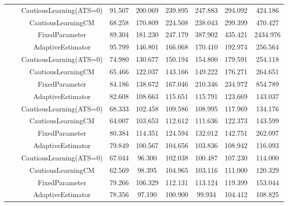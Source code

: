 \begin{table}[!h]
\begin{tabular}[t]{ccccccccc}
 &  & CautiousLearning(ATS=0) & 91.507 & 200.069 & 239.895 & 247.883 & 294.092 & 424.186\\

 &  & CautiousLearningCM & 68.258 & 170.809 & 224.508 & 238.043 & 299.399 & 470.427\\

 & \multirow[t]{-4}{*}{\centering\arraybackslash 0.35} & FixedParameter & 89.304 & 181.230 & 247.179 & 387.902 & 435.421 & 2434.976\\
\cmidrule{2-9}
 &  & AdaptiveEstimator & 95.799 & 146.801 & 166.068 & 170.410 & 192.974 & 256.564\\

 &  & CautiousLearning(ATS=0) & 74.980 & 130.677 & 150.194 & 154.800 & 179.591 & 254.118\\

 &  & CautiousLearningCM & 65.466 & 122.037 & 143.166 & 149.222 & 176.271 & 264.651\\

 & \multirow[t]{-4}{*}{\centering\arraybackslash 0.50} & FixedParameter & 84.186 & 138.672 & 167.046 & 210.346 & 234.972 & 854.789\\
\cmidrule{2-9}
 &  & AdaptiveEstimator & 82.608 & 108.663 & 115.651 & 115.791 & 123.669 & 143.037\\

 &  & CautiousLearning(ATS=0) & 68.333 & 102.458 & 109.586 & 108.995 & 117.969 & 134.176\\

 &  & CautiousLearningCM & 64.007 & 103.653 & 112.612 & 111.636 & 122.373 & 143.599\\

 & \multirow[t]{-4}{*}{\centering\arraybackslash 0.75} & FixedParameter & 80.384 & 114.351 & 124.594 & 132.012 & 142.751 & 262.097\\
\cmidrule{2-9}
 &  & AdaptiveEstimator & 79.849 & 100.567 & 104.656 & 103.836 & 108.942 & 116.093\\

 &  & CautiousLearning(ATS=0) & 67.044 & 96.300 & 102.038 & 100.487 & 107.230 & 114.000\\

 &  & CautiousLearningCM & 62.569 & 98.395 & 104.965 & 103.116 & 111.000 & 120.329\\

 & \multirow[t]{-4}{*}{\centering\arraybackslash 1.00} & FixedParameter & 79.266 & 106.329 & 112.131 & 113.124 & 119.399 & 153.044\\
\cmidrule{2-9}
 &  & AdaptiveEstimator & 78.356 & 97.190 & 100.900 & 99.934 & 104.412 & 108.825\\


\end{tabular}
\end{table}
